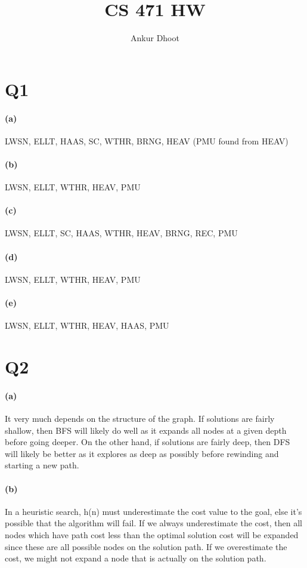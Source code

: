 \documentclass[11pt,a4paper]{article}
\begin{document}
\author{Ankur Dhoot}
\title{CS 471 HW}
\maketitle

\section*{Q1}

\paragraph*{(a)}
LWSN, ELLT, HAAS, SC, WTHR, BRNG, HEAV (PMU found from HEAV)

\paragraph*{(b)}
LWSN, ELLT, WTHR, HEAV, PMU

\paragraph*{(c)}
LWSN, ELLT, SC, HAAS, WTHR, HEAV, BRNG, REC, PMU

\paragraph*{(d)}
LWSN, ELLT, WTHR, HEAV, PMU

\paragraph*{(e)}
LWSN, ELLT, WTHR, HEAV, HAAS, PMU

\section*{Q2}
\paragraph*{(a)}
It very much depends on the structure of the graph. If solutions are fairly shallow, then BFS will likely do well as it expands all nodes at a given depth before going deeper. On the other hand, if solutions are fairly deep, then DFS will likely be better as it explores as deep as possibly before rewinding and starting a new path. 

\paragraph*{(b)}
In a heuristic search, h(n) must underestimate the cost value to the goal, else it's possible that the algorithm will fail. If we always underestimate the cost, then all nodes which have path cost less than the optimal solution cost will be expanded since these are all possible nodes on the solution path. If we overestimate the cost, we might not expand a node that is actually on the solution path.
\end{document}
